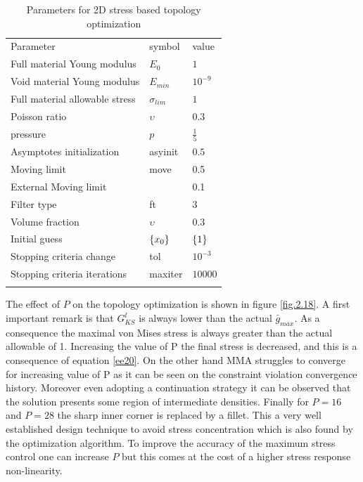 \begin{table}[h!]
                        \caption{Parameters for 2D stress based topology optimization}
                        \label{tab:2.2}       %
                        \centering
                        \begin{tabular}{lll}
                        \hline\noalign{\smallskip}
                        Parameter & symbol & value\\
                        \noalign{\smallskip}\hline\noalign{\smallskip}
           
                        Full material Young modulus & $E_0$ & $1$\\
                        Void material Young modulus & $E_{min}$ & $10^{-9}$ \\
                        Full material allowable stress & $\sigma_{lim}$ & $1$ \\
                        Poisson ratio & $\upsilon$ & $0.3$\\
                        pressure & $p$ & $\frac{1}{5}$\\
                        Asymptotes initialization & asyinit & $0.5$\\
                        Moving limit & move & 0.5\\
                        External Moving limit \cite{verbart2017unified}  &   & 0.1\\
                        Filter type & ft & 3\\
                        Volume fraction & $\upsilon$ & 0.3\\
                        Initial guess & $\left\lbrace{x_0}\right \rbrace$ & $\left\lbrace{1}\right \rbrace$
                       \\ Stopping criteria change & tol & $10^{-3}$\\
                        Stopping criteria iterations & maxiter& $10000$\\
                        \noalign{\smallskip}\hline
                        \end{tabular}
                        \end{table} 
The effect of $P$ on the topology optimization is shown in figure \ref{fig.2.18}. A first important remark is that $G_{KS}^l$ is always lower than the actual $\bar{g}_{max}$. As a consequence the maximal von Mises stress is always greater than the actual allowable of 1. Increasing the value of P the final stress is decreased, and this is a consequence of equation \ref{ee20}. On the other hand MMA struggles to converge for increasing value of P as it can be seen on the constraint violation convergence history. Moreover even adopting a continuation strategy it can be observed that the solution presents some region of intermediate densities. Finally for $P=16$ and $P=28$ the sharp inner corner is replaced by a fillet. This a very well established design technique to avoid stress concentration which is also found by the optimization algorithm. To improve the accuracy of the maximum stress control one can increase $P$ but this comes at the cost of a higher stress response non-linearity.
